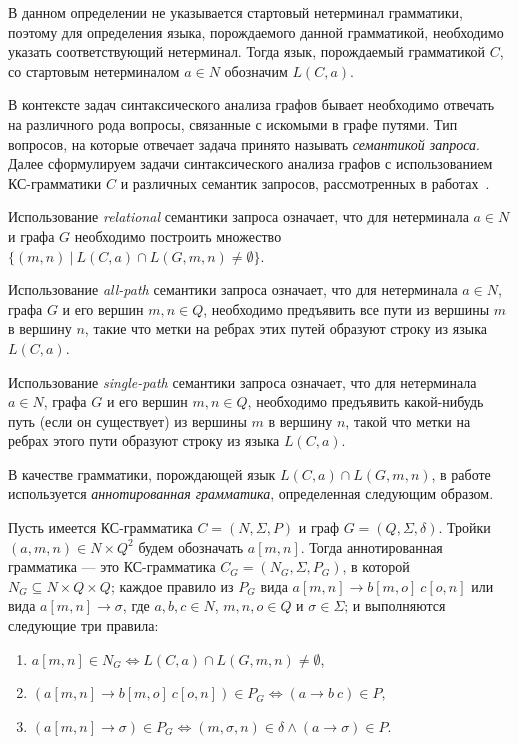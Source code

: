 В данном определении не указывается стартовый нетерминал грамматики, поэтому для определения языка, порождаемого данной грамматикой, необходимо указать соответствующий нетерминал. Тогда язык, порождаемый грамматикой $C$, со стартовым нетерминалом $a \in N$ обозначим $L(C,a)$.

В контексте задач синтаксического анализа графов бывает необходимо отвечать на различного рода вопросы, связанные с искомыми в графе путями. Тип вопросов, на которые отвечает задача принято называть \textit{семантикой запроса}. Далее сформулируем задачи синтаксического анализа графов с использованием КС-грамматики $C$ и различных семантик запросов, рассмотренных в работах~\cite{azimov-spbu-hellings1, azimov-spbu-hellings2}.

Использование \textit{relational} семантики запроса означает, что для нетерминала $a \in N$ и графа $G$ необходимо построить множество $\{(m, n)~|~L(C,a) \cap L(G,m,n) \neq \emptyset \}$.

Использование \textit{all-path} семантики запроса означает, что для нетерминала $a \in N$, графа $G$ и его вершин $m,n \in Q$, необходимо предъявить все пути из вершины $m$ в вершину $n$, такие что метки на ребрах этих путей образуют строку из языка $L(C,a)$.

Использование \textit{single-path} семантики запроса означает, что для нетерминала $a \in N$, графа $G$ и его вершин $m,n \in Q$, необходимо предъявить какой-нибудь путь (если он существует) из вершины $m$ в вершину $n$, такой что метки на ребрах этого пути образуют строку из языка $L(C,a)$.

В качестве грамматики, порождающей язык $L(C,a) \cap L(G,m,n)$, в работе~\cite{azimov-spbu-hellings2} используется \textit{аннотированная грамматика}, определенная следующим образом.

\begin{mydef}
Пусть имеется КС-грамматика $C = (N,\Sigma,P)$ и граф $G = (Q,\Sigma,\delta)$. Тройки $(a,m,n) \in N \times Q^{2}$ будем обозначать $a[m,n]$. Тогда аннотированная грамматика --- это КС-грамматика $C_{G} = (N_{G}, \Sigma, P_{G})$, в которой $N_{G} \subseteq N \times Q \times Q$; каждое правило из $P_{G}$ вида $a[m,n] \rightarrow b[m,o]~c[o,n]$ или вида $a[m,n] \rightarrow \sigma$, где $a,b,c \in N$, $m, n, o \in Q$ и $\sigma \in \Sigma$; и выполняются следующие три правила:

\begin{enumerate}
\item $a[m,n] \in N_{G} \Leftrightarrow L(C,a) \cap L(G,m,n) \neq \emptyset$,
\item $(a[m,n] \rightarrow b[m,o]~c[o,n]) \in P_{G} \Leftrightarrow (a \rightarrow b~c) \in P$,
\item $(a[m,n] \rightarrow \sigma) \in P_{G} \Leftrightarrow (m, \sigma, n) \in \delta \wedge (a \rightarrow \sigma) \in P$.
\end{enumerate}

\end{mydef}

